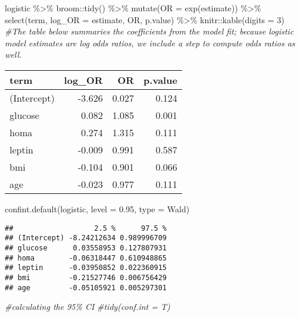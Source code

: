 \documentclass[
]{article}
\newenvironment{Shaded}{\begin{snugshade}}{\end{snugshade}}
\newcommand{\AttributeTok}[1]{\textcolor[rgb]{0.77,0.63,0.00}{#1}}
\newcommand{\CommentTok}[1]{\textcolor[rgb]{0.56,0.35,0.01}{\textit{#1}}}
\newcommand{\DecValTok}[1]{\textcolor[rgb]{0.00,0.00,0.81}{#1}}
\newcommand{\FloatTok}[1]{\textcolor[rgb]{0.00,0.00,0.81}{#1}}
\newcommand{\FunctionTok}[1]{\textcolor[rgb]{0.00,0.00,0.00}{#1}}
\newcommand{\NormalTok}[1]{#1}
\newcommand{\SpecialCharTok}[1]{\textcolor[rgb]{0.00,0.00,0.00}{#1}}
\begin{document}
\begin{Shaded}
\begin{Highlighting}[]
\NormalTok{logistic }\SpecialCharTok{\%\textgreater{}\%} 
\NormalTok{  broom}\SpecialCharTok{::}\FunctionTok{tidy}\NormalTok{() }\SpecialCharTok{\%\textgreater{}\%} 
  \FunctionTok{mutate}\NormalTok{(}\AttributeTok{OR =} \FunctionTok{exp}\NormalTok{(estimate)) }\SpecialCharTok{\%\textgreater{}\%}
  \FunctionTok{select}\NormalTok{(term, }\AttributeTok{log\_OR =}\NormalTok{ estimate, OR, p.value) }\SpecialCharTok{\%\textgreater{}\%} 
\NormalTok{  knitr}\SpecialCharTok{::}\FunctionTok{kable}\NormalTok{(}\AttributeTok{digits =} \DecValTok{3}\NormalTok{) }\CommentTok{\#The table below summaries the coefficients from the model fit; because logistic model estimates are log odds ratios, we include a step to compute odds ratios as well.}
\end{Highlighting}
\end{Shaded}

\begin{longtable}[]{@{}lrrr@{}}
\toprule
term & log\_OR & OR & p.value \\
\midrule
\endhead
(Intercept) & -3.626 & 0.027 & 0.124 \\
glucose & 0.082 & 1.085 & 0.001 \\
homa & 0.274 & 1.315 & 0.111 \\
leptin & -0.009 & 0.991 & 0.587 \\
bmi & -0.104 & 0.901 & 0.066 \\
age & -0.023 & 0.977 & 0.111 \\
\bottomrule
\end{longtable}

\begin{Shaded}
\begin{Highlighting}[]
\FunctionTok{confint.default}\NormalTok{(logistic, }\AttributeTok{level =} \FloatTok{0.95}\NormalTok{, }\AttributeTok{type =}\NormalTok{ Wald)}
\end{Highlighting}
\end{Shaded}

\begin{verbatim}
##                   2.5 %      97.5 %
## (Intercept) -8.24212634 0.989996709
## glucose      0.03558953 0.127807931
## homa        -0.06318447 0.610948865
## leptin      -0.03950852 0.022360915
## bmi         -0.21527746 0.006756429
## age         -0.05105921 0.005297301
\end{verbatim}

\begin{Shaded}
\begin{Highlighting}[]
\CommentTok{\#calculating the 95\% CI}
  \CommentTok{\#tidy(conf.int = T)}
\end{Highlighting}
\end{Shaded}
\end{document}
